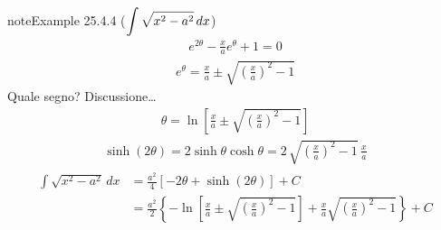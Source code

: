 \documentclass[letterpaper,10pt,italian]{jupyterBook}
\begin{document}
\begin{sphinxadmonition}{note}{Example 25.4.4 (\protect\(\displaystyle \int \sqrt{x^2 - a^2} \,  dx\protect\))}
\begin{equation*}
\begin{split}e^{2 \theta} - \frac{x}{a} e^{\theta} + 1 = 0\end{split}
\end{equation*}\begin{equation*}
\begin{split}e^{\theta} 
  = \frac{x}{a} \pm \sqrt{\left( \frac{x}{a} \right)^2 - 1}
\end{split}
\end{equation*}
\sphinxAtStartPar
{} Quale segno? Discussione… 
\begin{equation*}
\begin{split}\theta = \ln \left[ \frac{x}{a} \pm \sqrt{\left( \frac{x}{a} \right)^2 - 1} \right]\end{split}
\end{equation*}\begin{equation*}
\begin{split}\sinh (2 \theta) = 2 \sinh \theta \cosh \theta = 2 \, \sqrt{\left(\frac{x}{a}\right)^2 - 1} \, \frac{x}{a}\end{split}
\end{equation*}\begin{equation*}
\begin{split}\begin{aligned}
  \int \sqrt{x^2 - a^2} \, dx
   & = \frac{a^2}{4} \left[ -2 \theta + \sinh \left( 2 \theta \right) \right] + C \\
   & = \frac{a^2}{2} \left\{ -\ln \left[ \frac{x}{a}  \pm  \sqrt{\left( \frac{x}{a} \right)^2 - 1} \right] + \frac{x}{a} \sqrt{ \left(\frac{x}{a}\right)^2 - 1} \right\} + C
\end{aligned}\end{split}
\end{equation*}\end{sphinxadmonition}
\label{ch/infinitesimal_calculus/integrals:example-10}
\end{document}
